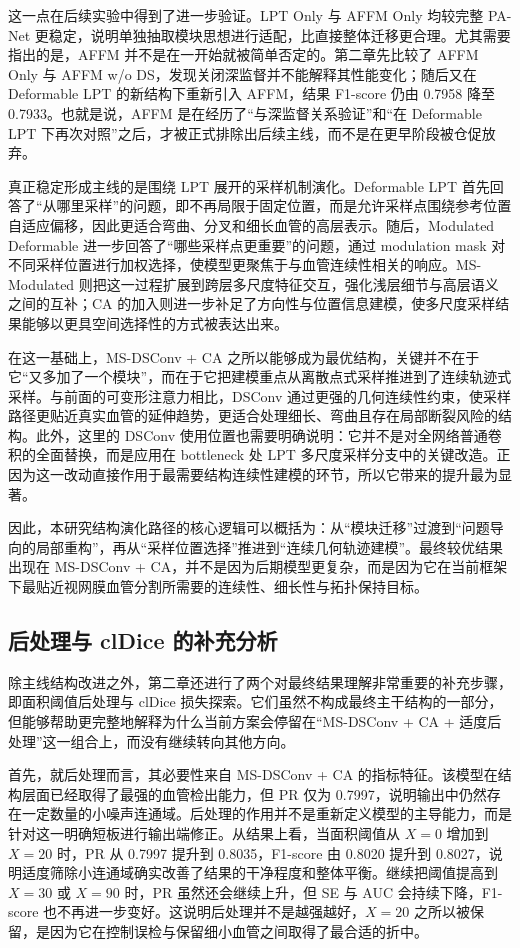 \documentclass[a4paper,12pt]{article}
\begin{document}
这一点在后续实验中得到了进一步验证。LPT Only 与 AFFM Only 均较完整 PA-Net 更稳定，说明单独抽取模块思想进行适配，比直接整体迁移更合理。尤其需要指出的是，AFFM 并不是在一开始就被简单否定的。第二章先比较了 AFFM Only 与 AFFM w/o DS，发现关闭深监督并不能解释其性能变化；随后又在 Deformable LPT 的新结构下重新引入 AFFM，结果 F1-score 仍由 0.7958 降至 0.7933。也就是说，AFFM 是在经历了“与深监督关系验证”和“在 Deformable LPT 下再次对照”之后，才被正式排除出后续主线，而不是在更早阶段被仓促放弃。

真正稳定形成主线的是围绕 LPT 展开的采样机制演化。Deformable LPT 首先回答了“从哪里采样”的问题，即不再局限于固定位置，而是允许采样点围绕参考位置自适应偏移，因此更适合弯曲、分叉和细长血管的高层表示。随后，Modulated Deformable 进一步回答了“哪些采样点更重要”的问题，通过 modulation mask 对不同采样位置进行加权选择，使模型更聚焦于与血管连续性相关的响应。MS-Modulated 则把这一过程扩展到跨层多尺度特征交互，强化浅层细节与高层语义之间的互补；CA 的加入则进一步补足了方向性与位置信息建模，使多尺度采样结果能够以更具空间选择性的方式被表达出来。

在这一基础上，MS-DSConv + CA 之所以能够成为最优结构，关键并不在于它“又多加了一个模块”，而在于它把建模重点从离散点式采样推进到了连续轨迹式采样。与前面的可变形注意力相比，DSConv 通过更强的几何连续性约束，使采样路径更贴近真实血管的延伸趋势，更适合处理细长、弯曲且存在局部断裂风险的结构。此外，这里的 DSConv 使用位置也需要明确说明：它并不是对全网络普通卷积的全面替换，而是应用在 bottleneck 处 LPT 多尺度采样分支中的关键改造。正因为这一改动直接作用于最需要结构连续性建模的环节，所以它带来的提升最为显著。

因此，本研究结构演化路径的核心逻辑可以概括为：从“模块迁移”过渡到“问题导向的局部重构”，再从“采样位置选择”推进到“连续几何轨迹建模”。最终较优结果出现在 MS-DSConv + CA，并不是因为后期模型更复杂，而是因为它在当前框架下最贴近视网膜血管分割所需要的连续性、细长性与拓扑保持目标。

\subsection{后处理与 clDice 的补充分析}

除主线结构改进之外，第二章还进行了两个对最终结果理解非常重要的补充步骤，即面积阈值后处理与 clDice 损失探索。它们虽然不构成最终主干结构的一部分，但能够帮助更完整地解释为什么当前方案会停留在“MS-DSConv + CA + 适度后处理”这一组合上，而没有继续转向其他方向。

首先，就后处理而言，其必要性来自 MS-DSConv + CA 的指标特征。该模型在结构层面已经取得了最强的血管检出能力，但 PR 仅为 0.7997，说明输出中仍然存在一定数量的小噪声连通域。后处理的作用并不是重新定义模型的主导能力，而是针对这一明确短板进行输出端修正。从结果上看，当面积阈值从 \(X=0\) 增加到 \(X=20\) 时，PR 从 0.7997 提升到 0.8035，F1-score 由 0.8020 提升到 0.8027，说明适度筛除小连通域确实改善了结果的干净程度和整体平衡。继续把阈值提高到 \(X=30\) 或 \(X=90\) 时，PR 虽然还会继续上升，但 SE 与 AUC 会持续下降，F1-score 也不再进一步变好。这说明后处理并不是越强越好，\(X=20\) 之所以被保留，是因为它在控制误检与保留细小血管之间取得了最合适的折中。
\end{document}
